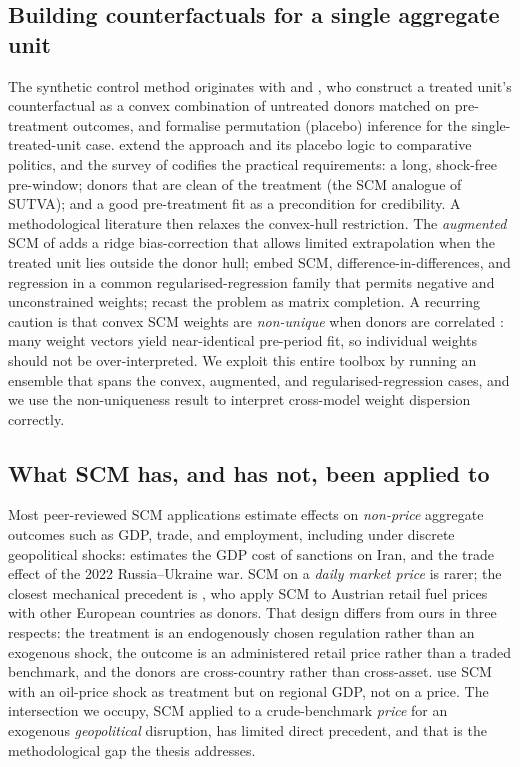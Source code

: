 \documentclass[11pt,a4paper]{article}
\begin{document}
\subsection{Building counterfactuals for a single aggregate unit}
The synthetic control method originates with \citet{abadiegardeazabal2003} and
\citet{abadie2010}, who construct a treated unit's counterfactual as a convex
combination of untreated donors matched on pre-treatment outcomes, and formalise
permutation (placebo) inference for the single-treated-unit case. \citet{abadie2015}
extend the approach and its placebo logic to comparative politics, and the survey of
\citet{abadie2021} codifies the practical requirements: a long, shock-free
pre-window; donors that are clean of the treatment (the SCM analogue of SUTVA); and a
good pre-treatment fit as a precondition for credibility. A methodological literature
then relaxes the convex-hull restriction. The \emph{augmented} SCM of
\citet{benmichael2021} adds a ridge bias-correction that allows limited extrapolation
when the treated unit lies outside the donor hull; \citet{doudchenko2016} embed SCM,
difference-in-differences, and regression in a common regularised-regression family
that permits negative and unconstrained weights; \citet{athey2021mc} recast the
problem as matrix completion. A recurring caution is that convex SCM weights are
\emph{non-unique} when donors are correlated \citep{abadielhour2021}: many weight
vectors yield near-identical pre-period fit, so individual weights should not be
over-interpreted. We exploit this entire toolbox by running an ensemble that spans the
convex, augmented, and regularised-regression cases, and we use the non-uniqueness
result to interpret cross-model weight dispersion correctly.

\subsection{What SCM has, and has not, been applied to}
Most peer-reviewed SCM applications estimate effects on \emph{non-price} aggregate
outcomes such as GDP, trade, and employment, including under discrete geopolitical
shocks: \citet{gharehgozli2017} estimates the GDP cost of sanctions on Iran, and
\citet{mancini2024} the trade effect of the 2022 Russia--Ukraine war. SCM on a
\emph{daily market price} is rarer; the closest mechanical precedent is
\citet{becker2021}, who apply SCM to Austrian retail fuel prices with other European
countries as donors. That design differs from ours in three respects: the treatment is
an endogenously chosen regulation rather than an exogenous shock, the outcome is an
administered retail price rather than a traded benchmark, and the donors are
cross-country rather than cross-asset. \citet{juarez2024} use SCM with an oil-price
shock as treatment but on regional GDP, not on a price. The intersection we occupy,
SCM applied to a crude-benchmark \emph{price} for an exogenous \emph{geopolitical}
disruption, has limited direct precedent, and that is the methodological gap the thesis
addresses.
\end{document}
